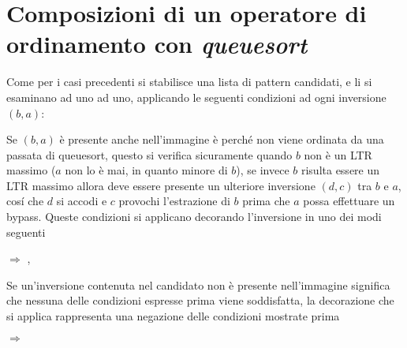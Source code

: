 \section{Composizioni di un operatore di ordinamento con \textit{queuesort}}
Come per i casi precedenti si stabilisce una lista di pattern candidati, e li si esaminano ad uno ad uno, applicando le seguenti condizioni ad ogni inversione $(b,a)$:
\begin{description} 
	\item Se $(b,a)$ \`e presente anche nell'immagine \`e perch\'e non viene ordinata da una passata di queuesort, questo si verifica sicuramente quando $b$ non \`e un LTR massimo ($a$ non lo \`e mai, in quanto minore di $b$), se invece $b$ risulta essere un LTR massimo allora deve essere presente un ulteriore inversione $(d,c)$ tra $b$ e $a$, cos\'i che $d$ si accodi e $c$ provochi l'estrazione di $b$ prima che $a$ possa effettuare un bypass. Queste condizioni si applicano decorando l'inversione in uno dei modi seguenti
	\begin{center}
		 $\Rightarrow$
		,
	\end{center}
	\item Se un'inversione contenuta nel candidato non \`e presente nell'immagine significa che nessuna delle condizioni espresse prima viene soddisfatta, la decorazione che si applica rappresenta una negazione delle condizioni mostrate prima
	\begin{center}
		 $\Rightarrow$
	\end{center}
\end{description}
